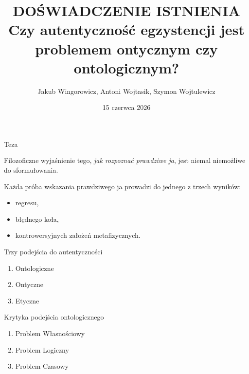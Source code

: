 \documentclass{beamer}
\title[Enhanced Beamer Demo]{\Large{DOŚWIADCZENIE ISTNIENIA} \\ \vspace{1em}
Czy autentyczność egzystencji jest problemem ontycznym czy ontologicznym?}
\author{Jakub Wingorowicz, Antoni Wojtasik, Szymon Wojtulewicz}
\date{15 czerwca 2026}
\begin{document}
 
\frame{\titlepage}
 
 
\begin{frame}{Teza}
  \large
  \begin{block}{}
    Filozoficzne wyjaśnienie tego, \emph{jak rozpoznać prawdziwe ja},
    jest niemal niemożliwe do sformułowania.
  \end{block}
  \vspace{1em}
  Każda próba wskazania prawdziwego ja prowadzi do jednego z trzech wyników:
  \begin{itemize}
    \item regresu,
    \item błędnego koła,
    \item kontrowersyjnych założeń metafizycznych.
  \end{itemize}
\end{frame}
 
\begin{frame}{Trzy podejścia do autentyczności}
  \huge {
    \begin{enumerate}
      \item Ontologiczne
      \item Ontyczne
      \item Etyczne
    \end{enumerate}
  }
\end{frame}
 
\begin{frame}{Krytyka podejścia ontologicznego}
  \huge {
    \begin{enumerate}
      \item Problem Własnościowy
      \item Problem Logiczny
      \item Problem Czasowy
    \end{enumerate}
  }
\end{frame}
 
 
\end{document}
